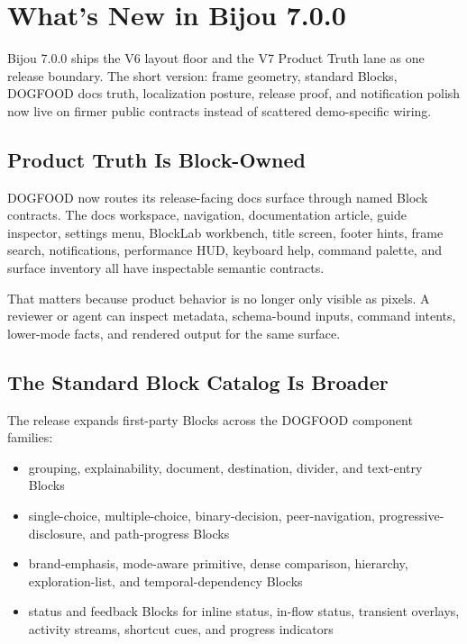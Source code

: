 \chapter{What's New in Bijou 7.0.0}\label{record-281}

\smallskip

Bijou 7.0.0 ships the V6 layout floor and the V7 Product Truth lane as one release boundary. The short version: frame geometry, standard Blocks, DOGFOOD docs truth, localization posture, release proof, and notification polish now live on firmer public contracts instead of scattered demo-specific wiring.

\section{Product Truth Is Block-Owned}\label{record-281-product-truth-is-block-owned}

DOGFOOD now routes its release-facing docs surface through named Block contracts. The docs workspace, navigation, documentation article, guide inspector, settings menu, BlockLab workbench, title screen, footer hints, frame search, notifications, performance HUD, keyboard help, command palette, and surface inventory all have inspectable semantic contracts.

That matters because product behavior is no longer only visible as pixels. A reviewer or agent can inspect metadata, schema-bound inputs, command intents, lower-mode facts, and rendered output for the same surface.

\section{The Standard Block Catalog Is Broader}\label{record-281-the-standard-block-catalog-is-broader}

The release expands first-party Blocks across the DOGFOOD component families:

\begin{itemize}
\tightlist
\item
  grouping, explainability, document, destination, divider, and text-entry Blocks
\item
  single-choice, multiple-choice, binary-decision, peer-navigation, progressive-disclosure, and path-progress Blocks
\item
  brand-emphasis, mode-aware primitive, dense comparison, hierarchy, exploration-list, and temporal-dependency Blocks
\item
  status and feedback Blocks for inline status, in-flow status, transient overlays, activity streams, shortcut cues, and progress indicators
\end{itemize}

